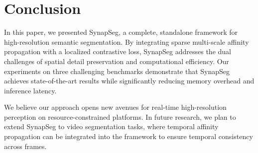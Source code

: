 \section{Conclusion}
In this paper, we presented SynapSeg, a complete, standalone framework for high-resolution semantic segmentation. By integrating sparse multi-scale affinity propagation with a localized contrastive loss, SynapSeg addresses the dual challenges of spatial detail preservation and computational efficiency. Our experiments on three challenging benchmarks demonstrate that SynapSeg achieves state-of-the-art results while significantly reducing memory overhead and inference latency.

We believe our approach opens new avenues for real-time high-resolution perception on resource-constrained platforms. In future research, we plan to extend SynapSeg to video segmentation tasks, where temporal affinity propagation can be integrated into the framework to ensure temporal consistency across frames.




